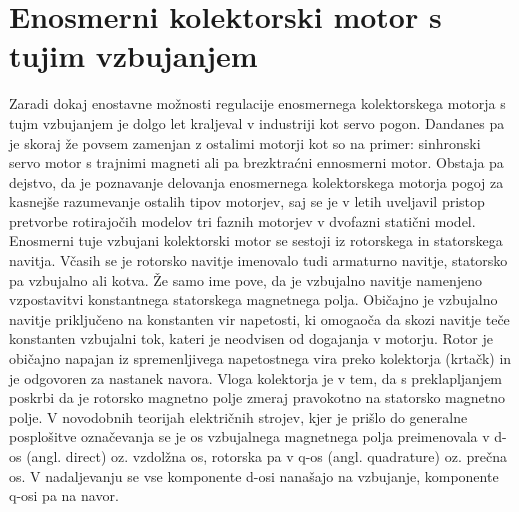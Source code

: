 \documentclass[a4paper,twoside,openright,12pt]{book}
\begin{document}
\section{Enosmerni kolektorski motor s tujim vzbujanjem}
Zaradi  dokaj enostavne možnosti regulacije enosmernega kolektorskega motorja s tujm vzbujanjem je dolgo let kraljeval v industriji kot servo pogon. Dandanes pa je  skoraj že povsem zamenjan z ostalimi motorji kot so na primer: sinhronski  servo motor s trajnimi magneti ali pa brezktraćni ennosmerni motor. Obstaja pa dejstvo, da je poznavanje delovanja enosmernega kolektorskega motorja pogoj za kasnejše razumevanje ostalih tipov motorjev, saj se je v letih uveljavil pristop pretvorbe rotirajočih modelov tri faznih motorjev v dvofazni statični model. \\
Enosmerni tuje vzbujani kolektorski motor se sestoji iz rotorskega in statorskega navitja. Včasih se je rotorsko navitje imenovalo tudi armaturno navitje, statorsko pa vzbujalno ali kotva. Že samo ime pove, da je vzbujalno navitje namenjeno vzpostavitvi konstantnega statorskega magnetnega polja. Običajno je vzbujalno navitje priključeno na konstanten vir napetosti, ki omogaoča da skozi navitje teče konstanten vzbujalni tok, kateri je neodvisen od dogajanja v motorju. Rotor je običajno napajan iz spremenljivega napetostnega vira preko kolektorja (krtačk) in je odgovoren za nastanek navora. Vloga kolektorja je v tem, da s preklapljanjem poskrbi da je rotorsko magnetno polje zmeraj pravokotno na statorsko magnetno polje. V novodobnih teorijah električnih strojev, kjer je prišlo do generalne posplošitve označevanja se je os vzbujalnega magnetnega polja preimenovala v d-os (angl. direct) oz. vzdolžna os, rotorska pa v q-os (angl. quadrature) oz. prečna os. V nadaljevanju se vse komponente d-osi  nanašajo na vzbujanje, komponente q-osi pa na navor.\\
\end{document}
